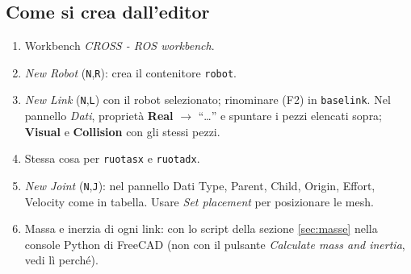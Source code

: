 \documentclass[11pt,a4paper]{article}
\renewcommand{\_}{\oldunderscore\allowbreak}
\begin{document}
\subsection{Come si crea dall'editor}
\begin{enumerate}[leftmargin=*]
  \item Workbench \emph{CROSS - ROS workbench}.
  \item \emph{New Robot} (\texttt{N},\texttt{R}): crea il contenitore \texttt{robot}.
  \item \emph{New Link} (\texttt{N},\texttt{L}) con il robot selezionato; rinominare (F2) in
    \texttt{base\_link}. Nel pannello \emph{Dati}, propriet\`a \textbf{Real} $\to$ ``\ldots'' e spuntare i
    pezzi elencati sopra; \textbf{Visual} e \textbf{Collision} con gli stessi pezzi.
  \item Stessa cosa per \texttt{ruota\_sx} e \texttt{ruota\_dx}.
  \item \emph{New Joint} (\texttt{N},\texttt{J}): nel pannello Dati Type, Parent, Child, Origin,
    Effort, Velocity come in tabella. Usare \emph{Set placement} per posizionare le mesh.
  \item Massa e inerzia di ogni link: con lo script della sezione \ref{sec:masse} nella console Python di
    FreeCAD (non con il pulsante \emph{Calculate mass and inertia}, vedi l\`i perch\'e).
\end{enumerate}
\end{document}
